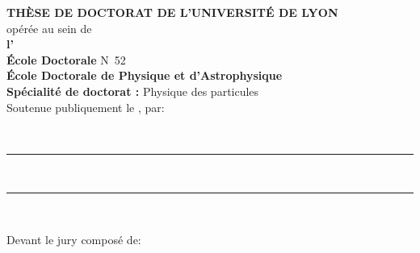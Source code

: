 {\large\textbf{THÈSE DE DOCTORAT DE L’UNIVERSITÉ DE LYON}}\\
opérée au sein de\\
\textbf{l'\insertinstitute}\\
\vspace{\baselineskip}
\textbf{École Doctorale} N\degree\ 52\\
\textbf{École Doctorale de Physique et d'Astrophysique}\\
\vspace{\baselineskip}
\textbf{Spécialité de doctorat :} Physique des particules\\
\vspace{\baselineskip}
\vspace{\baselineskip}
\vspace{\baselineskip}
Soutenue publiquement le \insertdate, par:

\vspace{.25cm}

{\Large\textbf{\insertauthor}}\\
\vspace{\baselineskip}
\vspace{\baselineskip}
\rule{\linewidth}{.5pt}\\
\vspace{\baselineskip}
{\LARGE\textbf{\inserttitle}}
\vspace{.5\baselineskip}

\rule{\linewidth}{.5pt}\\
\vspace{\baselineskip}
\vspace{\baselineskip}
\begin{flushleft}
    Devant le jury composé de:
\end{flushleft}


